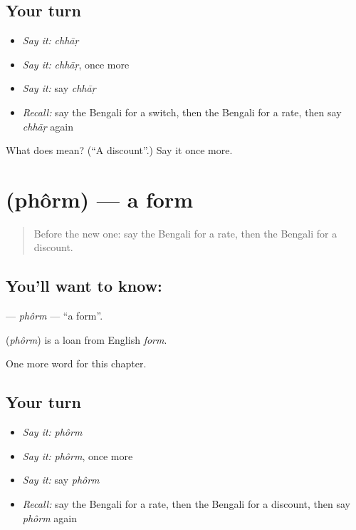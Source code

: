\subsection*{Your turn}
\begin{itemize}
\raggedright
  \item \emph{Say it:} \emph{chhāṛ}
  \item \emph{Say it:} \emph{chhāṛ}, once more
  \item \emph{Say it:} say \emph{chhāṛ}
  \item \emph{Recall:} say the Bengali for a switch, then the Bengali for a rate, then say \emph{chhāṛ} again
\end{itemize}

\begin{tcolorbox}[breakable,colback=teal!4,colframe=teal!35!black,title={Before you move on}]
What does  mean? (\textquotedblleft{}A discount\textquotedblright{}.) Say it once more.
\end{tcolorbox}
\section[\texorpdfstring{\bn{ফর্ম} (phôrm)}{ফর্ম (phôrm)}]{ (phôrm) — a form}

\label{lesson:BN-C259-phorm}



\begin{quote}
Before the new one: say the Bengali for a rate, then the Bengali for a discount.
\end{quote}

\subsection*{You'll want to know: }
\textbf{} — \emph{phôrm} — \textquotedblleft{}a form\textquotedblright{}.

\begin{cousinweb}
\textbf{} (\emph{phôrm}) is a loan from English \emph{form}.
\end{cousinweb}

\begin{grammarlens}[title={What you've built}]
One more word for this chapter.
\end{grammarlens}

\subsection*{Your turn}
\begin{itemize}
\raggedright
  \item \emph{Say it:} \emph{phôrm}
  \item \emph{Say it:} \emph{phôrm}, once more
  \item \emph{Say it:} say \emph{phôrm}
  \item \emph{Recall:} say the Bengali for a rate, then the Bengali for a discount, then say \emph{phôrm} again
\end{itemize}

